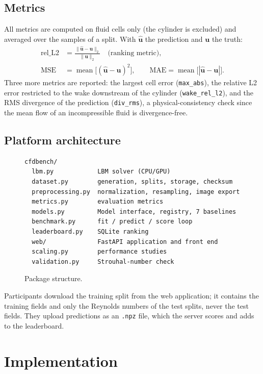 \documentclass[11pt,a4paper]{article}
\begin{document}
\subsection{Metrics}
All metrics are computed on fluid cells only (the cylinder is excluded) and averaged over the samples of a split. With $\hat{\mathbf u}$ the prediction and $\mathbf u$ the truth:
\begin{align}
  \mathrm{rel\_L2} &= \frac{\lVert \hat{\mathbf u}-\mathbf u\rVert_2}{\lVert \mathbf u\rVert_2} \quad\text{(ranking metric)},\\
  \mathrm{MSE} &= \operatorname{mean}\big[(\hat{\mathbf u}-\mathbf u)^2\big], \qquad \mathrm{MAE}=\operatorname{mean}\big[|\hat{\mathbf u}-\mathbf u|\big].
\end{align}
Three more metrics are reported: the largest cell error (\texttt{max\_abs}), the relative L2 error restricted to the wake downstream of the cylinder (\texttt{wake\_rel\_l2}), and the RMS divergence of the prediction (\texttt{div\_rms}), a physical-consistency check since the mean flow of an incompressible fluid is divergence-free.

\subsection{Platform architecture}
\begin{figure}[H]
\centering
\begin{lstlisting}
cfdbench/
  lbm.py            LBM solver (CPU/GPU)
  dataset.py        generation, splits, storage, checksum
  preprocessing.py  normalization, resampling, image export
  metrics.py        evaluation metrics
  models.py         Model interface, registry, 7 baselines
  benchmark.py      fit / predict / score loop
  leaderboard.py    SQLite ranking
  web/              FastAPI application and front end
  scaling.py        performance studies
  validation.py     Strouhal-number check
\end{lstlisting}
\caption{Package structure.}
\end{figure}
Participants download the training split from the web application; it contains the training fields and only the Reynolds numbers of the test splits, never the test fields. They upload predictions as an \texttt{.npz} file, which the server scores and adds to the leaderboard.

\section{Implementation}
\end{document}
